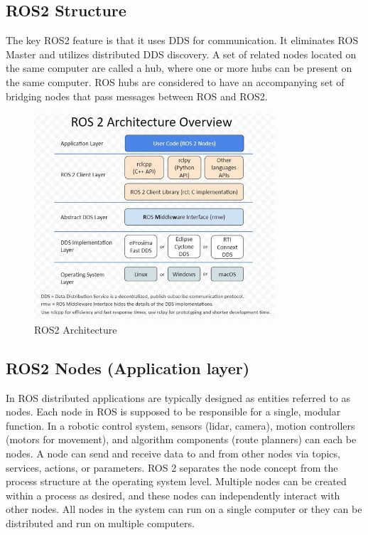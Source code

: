 	\subsection{ROS2 Structure}
	\label{Grundlagen:ROS2:ROS2_Structure}
	The key ROS2 feature is that it uses DDS for communication. It eliminates ROS Master and utilizes distributed DDS discovery.	A set of related nodes located on the same computer are called a hub, where one or more hubs can be present on the same computer. ROS hubs are considered to have an accompanying set of bridging nodes that pass messages between ROS and ROS2.\cite*[P.7]{Koubaa2021}
	\begin{figure}[H]
		\centering
		\includegraphics[width=0.8\textwidth]{"Bilder/ros-architecture.jpg"}
		\caption{ROS2 Architecture \cite{ros-2-architecture}}
		\label{fig:Background:Containers:Ros2_Architecture}					
	\end{figure}
	
	\subsection{ROS2 Nodes (Application layer)}
	\label{Grundlagen:ROS2:ROS2Nodes}

	In ROS distributed applications are typically designed as entities referred to as nodes. Each node in ROS is supposed to be responsible for a single, modular function. In a robotic control system, sensors (lidar, camera), motion controllers (motors for movement), and algorithm components (route planners) can each be nodes.  A node can send and receive data to and from other nodes via topics, services, actions, or parameters.
	ROS 2 separates the node concept from the process structure at the operating system level. Multiple nodes can be created within a process as desired, and these nodes can independently interact with other nodes. All nodes in the system can run on a single computer or they can be distributed and run on multiple computers.


